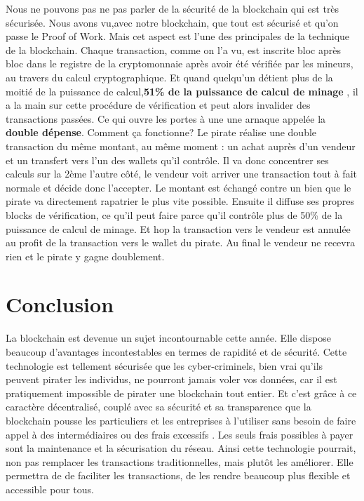\documentclass[12pt]{report}
\begin{document}
\hspace{1cm} Nous ne pouvons pas ne pas parler de la sécurité de la blockchain qui est très sécurisée. Nous avons vu,avec notre blockchain, que tout est sécurisé et qu'on passe le Proof of Work. Mais cet aspect est l'une des principales de la technique de la blockchain. Chaque transaction, comme on l'a vu, est inscrite bloc après bloc dans le registre de la cryptomonnaie après avoir été vérifiée par les mineurs, au travers du calcul cryptographique. Et quand quelqu’un détient plus de la moitié de la puissance de calcul,\textbf{51\% de la puissance de calcul de minage} , il a la main sur cette procédure de vérification et peut alors invalider des transactions passées. Ce qui ouvre les portes à une une arnaque appelée la  \textbf{double dépense}. Comment ça fonctionne? Le pirate réalise une double transaction du même montant, au même moment : un achat auprès d'un vendeur et un transfert vers l'un des wallets qu'il contrôle. Il va donc concentrer ses calculs sur la 2ème l'autre côté, le vendeur voit arriver une transaction tout à fait normale et décide donc l’accepter. Le montant est échangé contre un bien que le pirate va directement rapatrier le plus vite possible. Ensuite il diffuse ses propres blocks de vérification, ce qu'il peut faire parce qu'il contrôle plus de 50\% de la puissance de calcul de minage. Et hop la transaction vers le vendeur est annulée au profit de la transaction vers le wallet du pirate. Au final le vendeur ne recevra rien et le pirate y gagne doublement.

 
\newpage    
\section{Conclusion}

\hspace{1cm} La blockchain est devenue un sujet incontournable cette année. Elle dispose beaucoup d'avantages incontestables en termes de rapidité et de sécurité. Cette technologie est tellement sécurisée que les cyber-criminels, bien vrai qu'ils peuvent pirater les individus, ne pourront jamais  voler vos données, car il est pratiquement impossible de pirater une blockchain tout entier. Et c'est grâce à ce caractère décentralisé, couplé avec sa sécurité et sa transparence que la blockchain pousse les particuliers et les entreprises à l'utiliser sans besoin de faire appel à des intermédiaires ou des frais excessifs . Les seuls frais possibles à payer sont la maintenance et la sécurisation du réseau. Ainsi cette technologie pourrait, non pas remplacer les transactions traditionnelles, mais plutôt les améliorer. Elle permettra de de faciliter les transactions, de les rendre beaucoup plus flexible et accessible pour tous. \\ 
\end{document}
